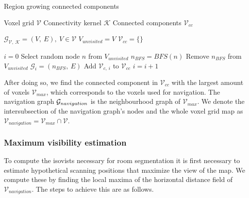\begin{algorithm}
    \caption{Region growing connected components}\label{alg:cap}
    \begin{algorithmic}

    \Require \quad Voxel grid \(\mathcal{V}\)
    \Require \quad Connectivity kernel \(\mathcal{K}\)
    \Ensure \quad Connected components \(\mathcal{V}_{cc}\)

    \State \(\mathcal{G}_{\mathcal{V},\ \mathcal{K}} = (V,\ E),\ V \in \mathcal{V}\) 
    \State \(V_{unvisited} = V\)
    \State \(\mathcal{V}_{cc} = \{\}\)
    
    \State \(i = 0\)
        \State Select random node \(n\) from \(V_{unvisited}\)
        \State \(n_{BFS} = BFS(n)\) 
        \State Remove \(n_{BFS}\) from \(V_{unvisited}\)
        \State \(\mathcal{G}_i = (n_{BFS},\ E)\)
        \State Add \(\mathcal{V}_{c,\ i}\) to \(\mathcal{V}_{cc}\)
        \State \(i = i + 1\)
    \EndWhile
    \end{algorithmic}
\end{algorithm}

After doing so, we find the connected component in \(\mathcal{V}_{cc}\) with the largest amount of voxels \(\mathcal{V}_{max}\), which corresponds to the voxels used for navigation. The navigation graph \(\mathcal{G}_{navigation}\) is the neighbourhood graph of \(\mathcal{V}_{max}\). We denote the intersubsection of the navigation graph's nodes and the whole voxel grid map as \(\mathcal{V}_{navigation} = \mathcal{V}_{max} \cap \mathcal{V}\).

\subsubsection{Maximum visibility estimation}
To compute the isovists necessary for room segmentation it is first necessary to estimate hypothetical scanning positions that maximize the view of the map. We compute these by finding the local maxima of the horizontal distance field of \(\mathcal{V}_{navigation}\). The steps to achieve this are as follows. 

